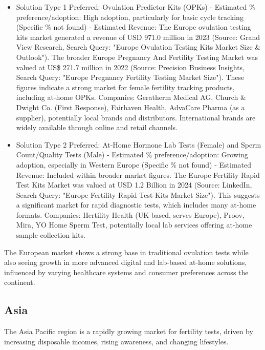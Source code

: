 \documentclass{article}
\begin{document}
\begin{itemize}
  \item Solution Type 1 Preferred: Ovulation Predictor Kits (OPKs) - Estimated \% preference/adoption: High adoption, particularly for basic cycle tracking (Specific \% not found) - Estimated Revenue: The Europe ovulation testing kits market generated a revenue of USD 971.0 million in 2023 (Source: Grand View Research, Search Query: "Europe Ovulation Testing Kits Market Size & Outlook"). The broader Europe Pregnancy And Fertility Testing Market was valued at US\$ 271.7 million in 2022 (Source: Precision Business Insights, Search Query: "Europe Pregnancy Fertility Testing Market Size"). These figures indicate a strong market for female fertility tracking products, including at-home OPKs.
    Companies: Geratherm Medical AG, Church \& Dwight Co. (First Response), Fairhaven Health, AdvaCare Pharma (as a supplier), potentially local brands and distributors. International brands are widely available through online and retail channels.
  \item Solution Type 2 Preferred: At-Home Hormone Lab Tests (Female) and Sperm Count/Quality Tests (Male) - Estimated \% preference/adoption: Growing adoption, especially in Western Europe (Specific \% not found) - Estimated Revenue: Included within broader market figures. The Europe Fertility Rapid Test Kits Market was valued at USD 1.2 Billion in 2024 (Source: LinkedIn, Search Query: "Europe Fertility Rapid Test Kits Market Size"). This suggests a significant market for rapid diagnostic tests, which includes many at-home formats.
    Companies: Hertility Health (UK-based, serves Europe), Proov, Mira, YO Home Sperm Test, potentially local lab services offering at-home sample collection kits.
\end{itemize}
The European market shows a strong base in traditional ovulation tests while also seeing growth in more advanced digital and lab-based at-home solutions, influenced by varying healthcare systems and consumer preferences across the continent.

\subsection{Asia}
The Asia Pacific region is a rapidly growing market for fertility tests, driven by increasing disposable incomes, rising awareness, and changing lifestyles.
\end{document}
